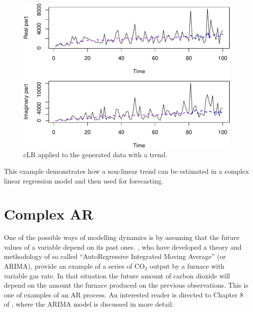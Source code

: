 \documentclass[
]{book}
\begin{document}
\begin{figure}
\centering
\includegraphics{Svetunkov---Svetunkov---Complex-Valued-Econometrics_files/figure-latex/dataWithTrendForecast-1.pdf}
\caption{\label{fig:dataWithTrendForecast}cLR applied to the generated data with a trend.}
\end{figure}

This example demonstrates how a non-linear trend can be estimated in a complex linear regression model and then used for forecasting.

\hypertarget{complex-ar}{%
\section{Complex AR}\label{complex-ar}}

One of the possible ways of modelling dynamics is by assuming that the future values of a variable depend on its past ones. \citet{Box1976}, who have developed a theory and methodology of so called ``AutoRegressive Integrated Moving Average'' (or ARIMA), provide an example of a series of CO\(_2\) output by a furnace with variable gas rate. In that situation the future amount of carbon dioxide will depend on the amount the furnace produced on the previous observations. This is one of examples of an AR process. An interested reader is directed to Chapter 8 of \citet{SvetunkovAdam}, where the ARIMA model is discussed in more detail.
\end{document}

